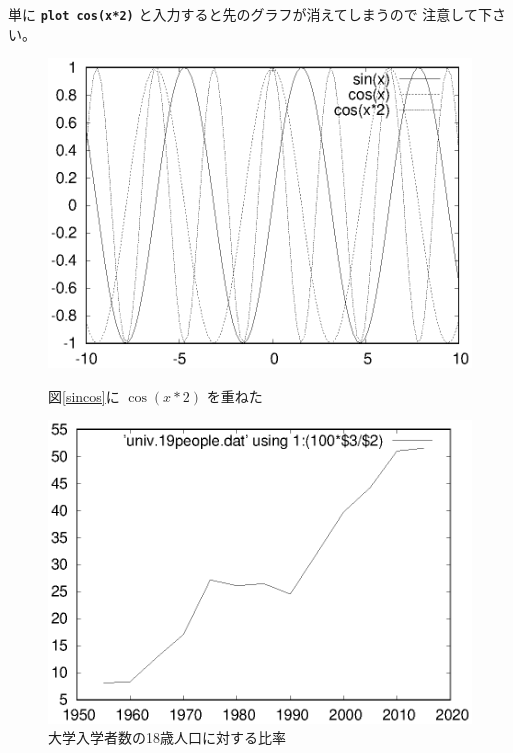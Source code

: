 \documentclass[a4j]{ujarticle} %
\begin{document}
単に {\tt\bf plot cos(x*2)} と入力すると先のグラフが消えてしまうので
注意して下さい。

\begin{figure}
\begin{minipage}[hbtp]{0.49\textwidth}
\includegraphics[width=\hsize]{sincos2.eps}
\caption{図\ref{sincos}に $\cos(x*2)$ を重ねた}
\label{sincos2}
\end{minipage}
\begin{minipage}[hbtp]{0.49\textwidth}
\includegraphics[width=\hsize]{univ.19people1.eps}
\caption{大学入学者数の18歳人口に対する比率}
\label{ratio}
\end{minipage}
\end{figure}
\end{document}
